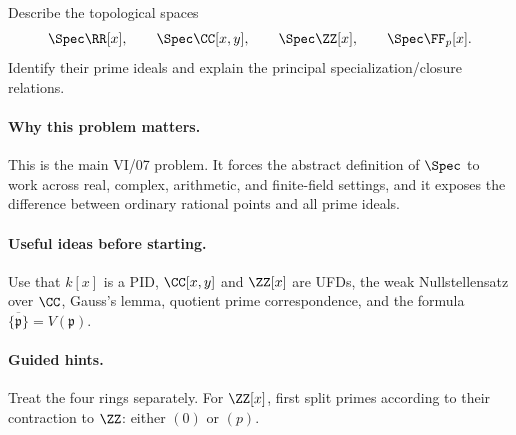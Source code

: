 \begin{problem}
Describe the topological spaces
\[
\Spec\RR[x],\qquad
\Spec\CC[x,y],\qquad
\Spec\ZZ[x],\qquad
\Spec\FF_p[x].
\]
Identify their prime ideals and explain the principal specialization/closure relations.
\end{problem}

\paragraph{Why this problem matters.}
This is the main VI/07 problem.  It forces the abstract definition of $\Spec$ to work
across real, complex, arithmetic, and finite-field settings, and it exposes the difference
between ordinary rational points and all prime ideals.

\paragraph{Useful ideas before starting.}
Use that $k[x]$ is a PID, $\CC[x,y]$ and $\ZZ[x]$ are UFDs, the weak Nullstellensatz over
$\CC$, Gauss's lemma, quotient prime correspondence, and the formula
$\overline{\{\mathfrak p\}}=V(\mathfrak p)$.

\paragraph{Guided hints.}
Treat the four rings separately.  For $\ZZ[x]$, first split primes according to their
contraction to $\ZZ$: either $(0)$ or $(p)$.

